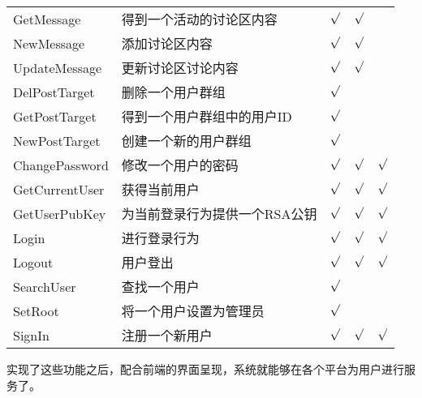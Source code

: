 \begin{table}[htb]
\begin{tabular}{llccc}
      GetMessage 		& 得到一个活动的讨论区内容 		& $\surd$	& $\surd$ 	& \\
      NewMessage 		& 添加讨论区内容 				& $\surd$	&  $\surd$	& \\
      UpdateMessage 	& 更新讨论区讨论内容 			& $\surd$	& $\surd$ 	& \\
      DelPostTarget 	& 删除一个用户群组 				& $\surd$	&  	& \\
      GetPostTarget 	& 得到一个用户群组中的用户ID 	& $\surd$	&  	& \\
      NewPostTarget 	& 创建一个新的用户群组 			& $\surd$	&  	& \\
      ChangePassword 	& 修改一个用户的密码 			& $\surd$	& $\surd$ 	&$\surd$ \\
      GetCurrentUser 	& 获得当前用户 					& $\surd$	& $\surd$ 	& $\surd$\\
      GetUserPubKey 	& 为当前登录行为提供一个RSA公钥 & $\surd$	& $\surd$ 	& $\surd$\\
      Login 			& 进行登录行为 					& $\surd$	& $\surd$ 	& $\surd$\\
      Logout 			& 用户登出 						& $\surd$	& $\surd$ 	& $\surd$\\
      SearchUser 		& 查找一个用户 					& $\surd$	&  	& \\
      SetRoot 			& 将一个用户设置为管理员 		& $\surd$	&  	& \\
      SignIn 			& 注册一个新用户 				& $\surd$	& $\surd$ 	&$\surd$ \\
      \bottomrule
    \end{tabular}
\end{table}

实现了这些功能之后，配合前端的界面呈现，系统就能够在各个平台为用户进行服务了。
